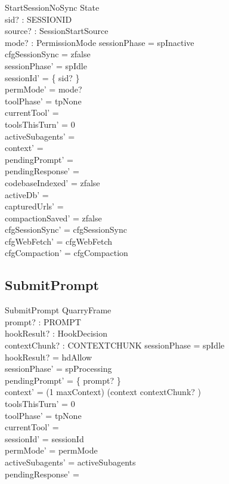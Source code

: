 \documentclass[a4paper,10pt,fleqn]{article}
\begin{document}
\begin{schema}{StartSessionNoSync}
  \Delta State \\
  sid? : SESSIONID \\
  source? : SessionStartSource \\
  mode? : PermissionMode
  \where
  sessionPhase = spInactive \\
  cfgSessionSync = zfalse \\
  sessionPhase' = spIdle \\
  sessionId' = \{ sid? \} \\
  permMode' = mode? \\
  toolPhase' = tpNone \\
  currentTool' = \emptyset \\
  toolsThisTurn' = 0 \\
  activeSubagents' = \emptyset \\
  context' = \langle \rangle \\
  pendingPrompt' = \emptyset \\
  pendingResponse' = \emptyset \\
  codebaseIndexed' = zfalse \\
  activeDb' = \emptyset \\
  capturedUrls' = \emptyset \\
  compactionSaved' = zfalse \\
  cfgSessionSync' = cfgSessionSync \\
  cfgWebFetch' = cfgWebFetch \\
  cfgCompaction' = cfgCompaction
\end{schema}

\subsection{SubmitPrompt}

\begin{schema}{SubmitPrompt}
  QuarryFrame \\
  prompt? : PROMPT \\
  hookResult? : HookDecision \\
  contextChunk? : CONTEXTCHUNK
  \where
  sessionPhase = spIdle \\
  hookResult? = hdAllow \\
  sessionPhase' = spProcessing \\
  pendingPrompt' = \{ prompt? \} \\
  context' = (1 \upto maxContext) \dres (context \cat \langle contextChunk? \rangle) \\
  toolsThisTurn' = 0 \\
  toolPhase' = tpNone \\
  currentTool' = \emptyset \\
  sessionId' = sessionId \\
  permMode' = permMode \\
  activeSubagents' = activeSubagents \\
  pendingResponse' = \emptyset
\end{schema}
\end{document}
